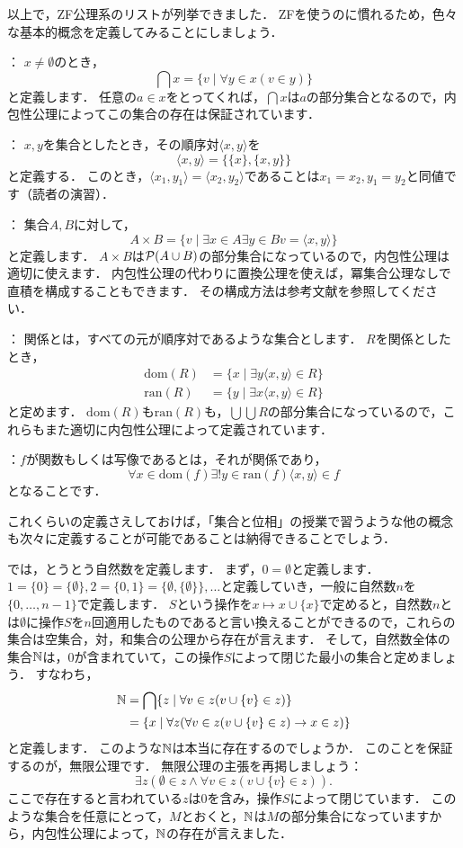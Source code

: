 \documentclass[./main]{subfiles}
\begin{document}
以上で，ZF公理系のリストが列挙できました．
ZFを使うのに慣れるため，色々な基本的概念を定義してみることにしましょう．

：
$x\neq\emptyset$のとき，
\[
\bigcap x=\{v\mid\forall y\in x(v\in y)\}
\]
と定義します．
任意の$a\in x$をとってくれば，$\bigcap x$は$a$の部分集合となるので，内包性公理によってこの集合の存在は保証されています．

：
$x, y$を集合としたとき，その順序対$\langle x, y \rangle$を
\[
\langle x, y\rangle=\{\{x\}, \{x, y\}\}
\]
と定義する．
このとき，$\langle x_1, y_1\rangle=\langle x_2, y_2\rangle$であることは$x_1=x_2, y_1=y_2$と同値です（読者の演習）．

：
集合$A, B$に対して，
\[
A\times B=\{v \mid \exists x\in A\exists y\in B v=\langle x, y\rangle\}
\]
と定義します．
$A\times B$は$\mathcal{P}(A\cup B)$の部分集合になっているので，内包性公理は適切に使えます．
内包性公理の代わりに置換公理を使えば，冪集合公理なしで直積を構成することもできます．
その構成方法は参考文献を参照してください．

：
関係とは，すべての元が順序対であるような集合とします．
$R$を関係としたとき，
\begin{align*}
\text{dom}(R) &=\{x\mid\exists y \langle x, y\rangle\in R\}\\
\text{ran}(R) &=\{y\mid\exists x \langle x,y\rangle\in R\}
\end{align*}
と定めます．
$\text{dom}(R)$も$\text{ran}(R)$も，$\bigcup\bigcup R$の部分集合になっているので，これらもまた適切に内包性公理によって定義されています．

：$f$が関数もしくは写像であるとは，それが関係であり，
\[
\forall x\in\text{dom}(f)\exists ! y\in\text{ran}(f)\langle x,y\rangle\in f
\]
となることです．

これくらいの定義さえしておけば，「集合と位相」の授業で習うような他の概念も次々に定義することが可能であることは納得できることでしょう．


では，とうとう自然数を定義します．
まず，$0=\emptyset$と定義します．
$1=\{0\}=\{\emptyset\}, 2=\{0, 1\}=\{\emptyset,\{\emptyset\}\},\ldots$と定義していき，一般に自然数$n$を$\{0,\ldots,n-1\}$で定義します．
$S$という操作を$x\mapsto x\cup\{x\}$で定めると，自然数$n$とは$\emptyset$に操作$S$を$n$回適用したものであると言い換えることができるので，これらの集合は空集合，対，和集合の公理から存在が言えます．
そして，自然数全体の集合$\mathbb{N}$は，$0$が含まれていて，この操作$S$によって閉じた最小の集合と定めましょう．
すなわち，
\begin{align*}
\mathbb{N} &=\bigcap\{z\mid\forall v\in z(v\cup\{v\}\in z)\}\\
&=\{x\mid\forall z(\forall v\in z(v\cup\{v\}\in z)\to x\in z)\}
\end{align*}
と定義します．
このような$\mathbb{N}$は本当に存在するのでしょうか．
このことを保証するのが，無限公理です．
無限公理の主張を再掲しましょう：
\[
\exists z(\emptyset\in z\wedge\forall v\in z(v\cup\{v\}\in z)).
\]
ここで存在すると言われている$z$は0を含み，操作$S$によって閉じています．
このような集合を任意にとって，$M$とおくと，$\mathbb{N}$は$M$の部分集合になっていますから，内包性公理によって，$\mathbb{N}$の存在が言えました．
\end{document}
